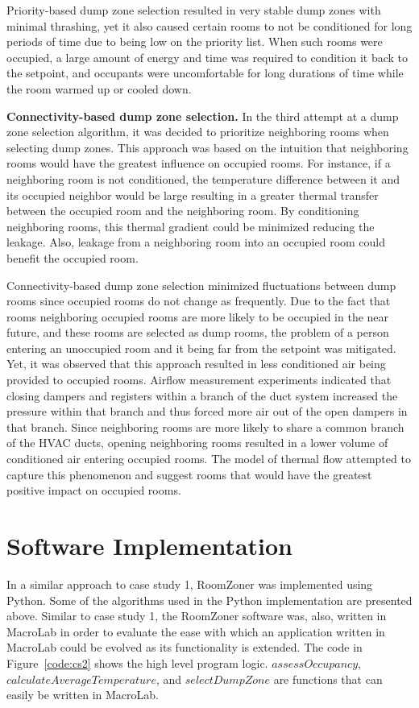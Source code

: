 Priority-based dump zone selection resulted in very stable dump zones with
minimal thrashing, yet it also caused certain rooms to not be conditioned for
long periods of time due to being low on the priority list. When such rooms were
occupied, a large amount of energy and time was required to condition it back to
the setpoint, and occupants were uncomfortable for long durations of time while
the room warmed up or cooled down. 

\par {\bf Connectivity-based dump zone selection. } In the third attempt at a
dump zone selection algorithm, it was decided to prioritize neighboring rooms
when selecting dump zones. This approach was based on the intuition that
neighboring rooms would have the greatest influence on occupied rooms. For
instance, if a neighboring room is not conditioned, the temperature difference
between it and its occupied neighbor would be large resulting in a greater
thermal transfer between the occupied room and the neighboring room. By
conditioning neighboring rooms, this thermal gradient could be minimized
reducing the leakage. Also, leakage from a neighboring room into an occupied
room could benefit the occupied room.

Connectivity-based dump zone selection minimized fluctuations between dump rooms
since occupied rooms do not change as frequently. Due to the fact that rooms
neighboring occupied rooms are more likely to be occupied in the near future,
and these rooms are selected as dump rooms, the problem of a person entering an
unoccupied room and it being far from the setpoint was mitigated. Yet, it was
observed that this approach resulted in less conditioned air being provided to
occupied rooms. Airflow measurement experiments indicated that closing dampers
and registers within a branch of the duct system increased the pressure within
that branch and thus forced more air out of the open dampers in that
branch. Since neighboring rooms are more likely to share a common branch of the
HVAC ducts, opening neighboring rooms resulted in a lower volume of conditioned
air entering occupied rooms. The model of thermal flow attempted to capture this
phenomenon and suggest rooms that would have the greatest positive impact on
occupied rooms.

\section{Software Implementation}

In a similar approach to case study 1, RoomZoner was implemented using
Python. Some of the algorithms used in the Python implementation are presented
above. Similar to case study 1, the RoomZoner software was, also, written in
MacroLab in order to evaluate the ease with which an application written in
MacroLab could be evolved as its functionality is extended. The code in
Figure~\ref{code:cs2} shows the high level program logic. $assessOccupancy$,
$calculateAverageTemperature$, and $selectDumpZone$ are functions that can
easily be written in MacroLab.

